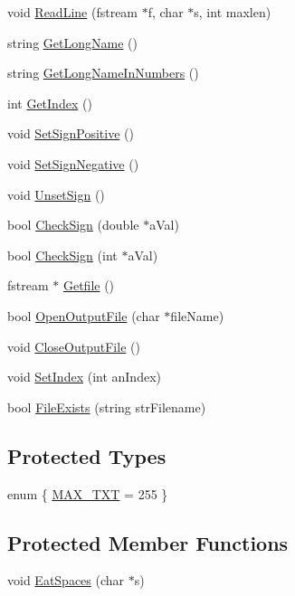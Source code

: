 \begin{DoxyCompactItemize}
void \hyperlink{classbase_a25bbc64113a939ec258c996b3000c112}{ReadLine} (fstream $\ast$f, char $\ast$s, int maxlen)
\item 
string \hyperlink{classbase_aae39ec3da4311af6b93e424d29b2c66a}{GetLongName} ()
\item 
string \hyperlink{classbase_adc95005de44dba3af83c3d129d2ccba7}{GetLongNameInNumbers} ()
\item 
int \hyperlink{classbase_a1b4ec2736a9fa992d45fdbac5f964896}{GetIndex} ()
\item 
void \hyperlink{classbase_a3e3ad9f4d881b5f6714a9864dceedab3}{SetSignPositive} ()
\item 
void \hyperlink{classbase_a34d7bbc86ce70c03d9af72b95d1943ce}{SetSignNegative} ()
\item 
void \hyperlink{classbase_a6cd9c49580e376c03ad85179a78b287a}{UnsetSign} ()
\item 
bool \hyperlink{classbase_af7d1c48d9c4d70ab66ada169492bc3bb}{CheckSign} (double $\ast$aVal)
\item 
bool \hyperlink{classbase_af2babc9c4b820165f746bb531866643c}{CheckSign} (int $\ast$aVal)
\item 
fstream $\ast$ \hyperlink{classbase_ab9acf14b8bb1b3e47dc9312dbf0888c9}{Getfile} ()
\item 
bool \hyperlink{classbase_a0e19bdf15527693c91a1bb6feddfaba6}{OpenOutputFile} (char $\ast$fileName)
\item 
void \hyperlink{classbase_ad76df71a686123678d59cceb6045e24e}{CloseOutputFile} ()
\item 
void \hyperlink{classbase_a0941fad0c59ce0c15d4846748092ba3a}{SetIndex} (int anIndex)
\item 
bool \hyperlink{classbase_a7e46bf398988aee085433dd074edff44}{FileExists} (string strFilename)
\end{DoxyCompactItemize}
\subsection*{Protected Types}
\begin{DoxyCompactItemize}
\item 
enum \{ \hyperlink{classbase_aedb7805f64440b0f775949a1dbcf2f0ea768bca936198aad1beec3c138c1fe987}{MAX\_\-TXT} = 255
 \}
\end{DoxyCompactItemize}
\subsection*{Protected Member Functions}
\begin{DoxyCompactItemize}
\item 
void \hyperlink{classbase_af2a52574d11ffe404e59c3b609b9853c}{EatSpaces} (char $\ast$s)
\end{DoxyCompactItemize}
